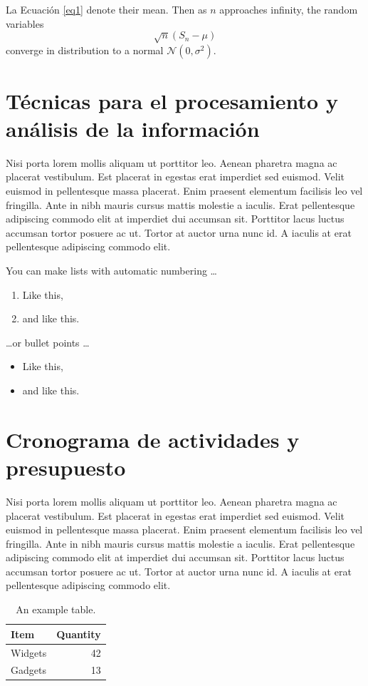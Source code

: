 La Ecuación \ref{eq1} denote their mean. Then as $n$ approaches infinity, the random variables $$\sqrt{n}(S_n - \mu)$$ converge in distribution to a normal $\mathcal{N}(0, \sigma^2)$.

\section{Técnicas para el procesamiento y análisis de la información}
Nisi porta lorem mollis aliquam ut porttitor leo. Aenean pharetra magna ac placerat vestibulum. Est placerat in egestas erat imperdiet sed euismod. Velit euismod in pellentesque massa placerat. Enim praesent elementum facilisis leo vel fringilla. Ante in nibh mauris cursus mattis molestie a iaculis. Erat pellentesque adipiscing commodo elit at imperdiet dui accumsan sit. Porttitor lacus luctus accumsan tortor posuere ac ut. Tortor at auctor urna nunc id. A iaculis at erat pellentesque adipiscing commodo elit.

You can make lists with automatic numbering \dots

\begin{enumerate}
	\item Like this,
	\item and like this.
\end{enumerate}
\dots or bullet points \dots
\begin{itemize}
	\item Like this,
	\item and like this.
\end{itemize}


\section{Cronograma de actividades y presupuesto}
Nisi porta lorem mollis aliquam ut porttitor leo. Aenean pharetra magna ac placerat vestibulum. Est placerat in egestas erat imperdiet sed euismod. Velit euismod in pellentesque massa placerat. Enim praesent elementum facilisis leo vel fringilla. Ante in nibh mauris cursus mattis molestie a iaculis. Erat pellentesque adipiscing commodo elit at imperdiet dui accumsan sit. Porttitor lacus luctus accumsan tortor posuere ac ut. Tortor at auctor urna nunc id. A iaculis at erat pellentesque adipiscing commodo elit.

\begin{table}[h]
	\centering
	\begin{tabular}{l|r}
		Item & Quantity \\\hline
		Widgets & 42 \\
		Gadgets & 13
	\end{tabular}
	\caption{\label{tab:widgets}An example table.}
\end{table}
